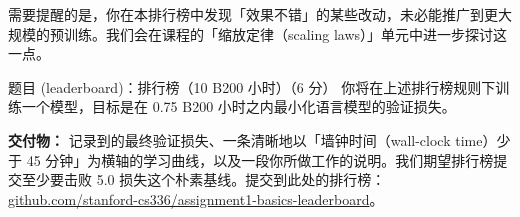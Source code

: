 需要提醒的是，你在本排行榜中发现「效果不错」的某些改动，未必能推广到更大规模的预训练。我们会在课程的「缩放定律（scaling laws）」单元中进一步探讨这一点。

\begin{problembox}{题目 (leaderboard)：排行榜（10 B200 小时）（6 分）}
你将在上述排行榜规则下训练一个模型，目标是在 0.75 B200 小时之内最小化语言模型的验证损失。

\begin{deliverablebox}
\textbf{交付物：} 记录到的最终验证损失、一条清晰地以「墙钟时间（wall-clock time）少于 45 分钟」为横轴的学习曲线，以及一段你所做工作的说明。我们期望排行榜提交至少要击败 5.0 损失这个朴素基线。提交到此处的排行榜：\url{github.com/stanford-cs336/assignment1-basics-leaderboard}。
\end{deliverablebox}
\end{problembox}

